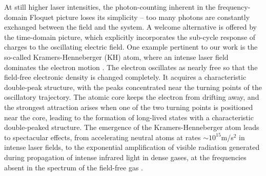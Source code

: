 At still higher laser intensities, the photon-counting inherent 
in the frequency-domain Floquet picture loses its simplicity -- 
too many photons are constantly exchanged between the field and the system. A welcome alternative is offered by the time-domain picture, which explicitly incorporates
the sub-cycle response of charges to the oscillating electric field. 
One example pertinent to our work is the so-called Kramers-Henneberger (KH) atom, where an intense laser field dominates the electron motion \cite{Popov_1,Henneberger_1,Gavrila_1}. The electron oscillates as nearly free so that the field-free electronic density is changed completely. 
It acquires a characteristic double-peak structure, 
with the peaks concentrated near the turning points of the 
oscillatory trajectory. The atomic core keeps the electron from drifting away, and the strongest attraction
arises when one of the two turning points is positioned 
near the core, leading to the formation of long-lived states
with a characteristic double-peaked structure.
The emergence of the Kramers-Henneberger atom leads to 
spectacular effects, from
accelerating neutral atoms at rates $\sim 10^{15}$m/s$^2$ in 
intense laser fields, to the exponential amplification of visible radiation generated
during propagation of intense infrared light in dense gases,
at the frequencies absent in the spectrum of the field-free 
gas \cite{Matthews_1}.
